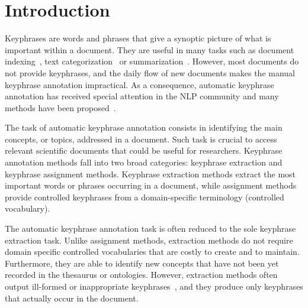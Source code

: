 \section{Introduction}
\label{sec:introduction}


Keyphrases are words and phrases that give a synoptic picture of what is important within a document.
%
They are useful in many tasks such as document indexing~\cite{gutwin1999keyphrasesfordigitallibraries}, text categorization~\cite{hulth-megyesi:2006:COLACL} or summarization~\cite{litvak2008graphbased}.
%
However, most documents do not provide keyphrases, and the daily flow of new documents makes the manual
keyphrase annotation impractical.
%
As a consequence, automatic keyphrase annotation has received special attention in the NLP community and many methods have been proposed~\cite{hasan2014state_of_the_art}.


The task of automatic keyphrase annotation consists in identifying the main concepts, or topics, addressed in a document.
%
Such task is crucial to access relevant scientific documents that could be useful for researchers.
%
Keyphrase annotation methods fall into two broad categories: keyphrase extraction and keyphrase assignment methods.
%
Keyphrase extraction methods extract the most important words or phrases occurring in a document, while assignment methods provide controlled keyphrases from a domain-specific terminology (controlled vocabulary).

The automatic keyphrase annotation task is often reduced to the sole keyphrase extraction task.
%
Unlike assignment methods, extraction methods do not require domain specific controlled vocabularies that are costly to create and to maintain.
%
Furthermore, they are able to identify new concepts that have not been yet recorded in the thesaurus or ontologies.
%
However, extraction methods often output ill-formed or inappropriate keyphrases~\cite{medelyan2008smalltrainingset}, and they produce only keyphrases that actually occur in the document.

